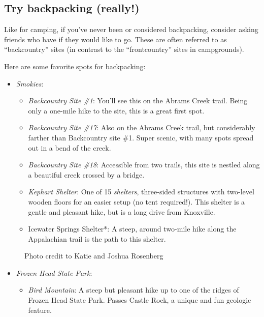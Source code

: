 \documentclass[
  letterpaper,
  DIV=11,
  numbers=noendperiod]{scrreprt}
\makeatletter
\providecommand{\tightlist}{%
  \setlength{\itemsep}{0pt}\setlength{\parskip}{0pt}}\usepackage{longtable,booktabs,array}
\newcommand*\pandocbounded[1]{%
  \sbox\pandoc@box{#1}%
  \Gscale@div\@tempa{\textheight}{\dimexpr\ht\pandoc@box+\dp\pandoc@box\relax}%
  \Gscale@div\@tempb{\linewidth}{\wd\pandoc@box}%
  \ifdim\@tempb\p@<\@tempa\p@\let\@tempa\@tempb\fi%
  \ifdim\@tempa\p@<\p@\scalebox{\@tempa}{\usebox\pandoc@box}%
  \else\usebox{\pandoc@box}%
  \fi%
}
\makeatother
\begin{document}
\subsection{Try backpacking (really!)}\label{try-backpacking-really}

Like for camping, if you've never been or considered backpacking,
consider asking friends who have if they would like to go. These are
often referred to as ``backcountry'' sites (in contrast to the
``frontcountry'' sites in campgrounds).

Here are some favorite spots for backpacking:

\begin{itemize}
\tightlist
\item
  \emph{Smokies}:

  \begin{itemize}
  \tightlist
  \item
    \emph{Backcountry Site \#1}: You'll see this on the Abrams Creek
    trail. Being only a one-mile hike to the site, this is a great first
    spot.
  \item
    \emph{Backcountry Site \#17}: Also on the Abrams Creek trail, but
    considerably farther than Backcountry site \#1. Super scenic, with
    many spots spread out in a bend of the creek.
  \item
    \emph{Backcountry Site \#18}: Accessible from two trails, this site
    is nestled along a beautiful creek crossed by a bridge.
  \item
    \emph{Kephart Shelter}: One of 15 \emph{shelters}, three-sided
    structures with two-level wooden floors for an easier setup (no tent
    required!). This shelter is a gentle and pleasant hike, but is a
    long drive from Knoxville.
  \item
    Icewater Springs Shelter*: A steep, around two-mile hike along the
    Appalachian trail is the path to this shelter.
  \end{itemize}
\end{itemize}

\begin{figure}[H]

{\centering \pandocbounded{\texttt{[image: img/leconte-summit.jpeg]}}

}

\caption{Photo credit to Katie and Joshua Rosenberg}

\end{figure}%

\begin{itemize}
\tightlist
\item
  \emph{Frozen Head State Park}:

  \begin{itemize}
  \tightlist
  \item
    \emph{Bird Mountain}: A steep but pleasant hike up to one of the
    ridges of Frozen Head State Park. Passes Castle Rock, a unique and
    fun geologic feature.
  \end{itemize}
\end{itemize}
\end{document}
